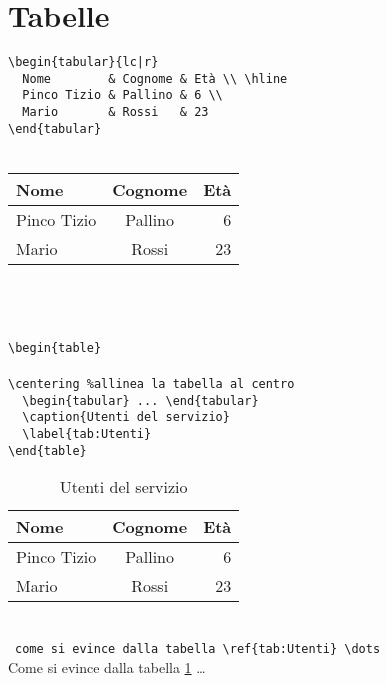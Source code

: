 \section{Tabelle}
  \verb!\begin{tabular}{lc|r}                   !\\
  \verb!  Nome        & Cognome & Età \\ \hline !\\
  \verb!  Pinco Tizio & Pallino & 6 \\          !\\
  \verb!  Mario       & Rossi   & 23            !\\
  \verb!\end{tabular}                           !\\~\\
    \begin{tabular}{lc|r}
      Nome & Cognome & Età \\ \hline
      Pinco Tizio & Pallino & 6 \\
      Mario & Rossi & 23
    \end{tabular}\\
~\\~
    \\\verb!\begin{table}                       !\\
    \\\verb!\centering %allinea la tabella al centro!\\
    \verb!  \begin{tabular} ... \end{tabular} !\\
    \verb!  \caption{Utenti del servizio}     !\\
    \verb!  \label{tab:Utenti}                !\\
    \verb!\end{table}                         !\\
      \begin{table}[!h]\centering
        \begin{tabular}{lc|r}
          Nome & Cognome & Età \\ \hline
          Pinco Tizio & Pallino & 6 \\
          Mario & Rossi & 23
        \end{tabular}
        \caption{Utenti del servizio}
        \label{tab:Utenti}
      \end{table}
      ~\\~\texttt{come si evince dalla tabella \textbackslash ref\{tab:Utenti\} \textbackslash dots} \\Come si evince dalla tabella \ref{tab:Utenti} \dots

